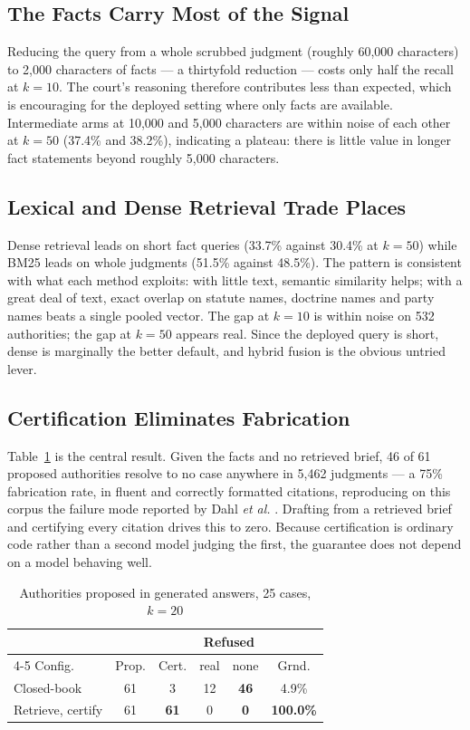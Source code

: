 \documentclass[10pt,conference]{IEEEtran}
\begin{document}
\subsection{The Facts Carry Most of the Signal}

Reducing the query from a whole scrubbed judgment (roughly 60{,}000 characters) to 2{,}000
characters of facts --- a thirtyfold reduction --- costs only half the recall at $k{=}10$.
The court's reasoning therefore contributes less than expected, which is encouraging for the
deployed setting where only facts are available. Intermediate arms at 10{,}000 and 5{,}000
characters are within noise of each other at $k{=}50$ (37.4\% and 38.2\%), indicating a
plateau: there is little value in longer fact statements beyond roughly 5{,}000 characters.

\subsection{Lexical and Dense Retrieval Trade Places}

Dense retrieval leads on short fact queries (33.7\% against 30.4\% at $k{=}50$) while BM25
leads on whole judgments (51.5\% against 48.5\%). The pattern is consistent with what each
method exploits: with little text, semantic similarity helps; with a great deal of text,
exact overlap on statute names, doctrine names and party names beats a single pooled vector.
The gap at $k{=}10$ is within noise on 532 authorities; the gap at $k{=}50$ appears real.
Since the deployed query is short, dense is marginally the better default, and hybrid fusion
\cite{lewis2020} is the obvious untried lever.

\subsection{Certification Eliminates Fabrication}

Table~\ref{tab:certify} is the central result. Given the facts and no retrieved brief, 46 of
61 proposed authorities resolve to no case anywhere in 5{,}462 judgments --- a 75\%
fabrication rate, in fluent and correctly formatted citations, reproducing on this corpus the
failure mode reported by Dahl \emph{et al.} \cite{dahl2024}. Drafting from a retrieved brief
and certifying every citation drives this to zero. Because certification is ordinary code
rather than a second model judging the first, the guarantee does not depend on a model
behaving well.

\begin{table}[t]
\caption{Authorities proposed in generated answers, 25 cases, $k{=}20$}
\label{tab:certify}
\centering
\footnotesize
\begin{tabular}{@{}lccccc@{}}
\toprule
& & & \multicolumn{2}{c}{Refused} & \\
\cmidrule(lr){4-5}
Config. & Prop. & Cert. & real & none & Grnd. \\
\midrule
Closed-book & 61 & 3 & 12 & \textbf{46} & 4.9\% \\
Retrieve, certify & 61 & \textbf{61} & 0 & \textbf{0} & \textbf{100.0\%} \\
\bottomrule
\end{tabular}
\end{table}
\end{document}
